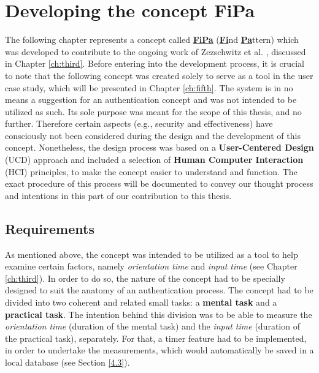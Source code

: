 
\chapter{Developing the concept FiPa}\label{ch:forth}
The following chapter represents a concept called \underline{\textbf{FiPa}} (\underline{\textbf{Fi}}nd \underline{\textbf{Pa}}ttern) which was developed to contribute to the ongoing work of Zezschwitz et al. \cite{Zezschwitz}, discussed in Chapter \ref{ch:third}. Before entering into the development process, it is crucial to note that the following concept was created solely to serve as a tool in the user case study, which will be presented in Chapter \ref{ch:fifth}. The system is in no means a suggestion for an authentication concept and was not intended to be utilized as such. Its sole purpose was meant for the scope of this thesis, and no further. Therefore certain aspects (e.g., security and effectiveness) have consciously not been considered during the design and the development of this concept. Nonetheless, the design process was based on a  \textbf{User-Centered Design} (UCD) approach and included a selection of \textbf{Human Computer Interaction} (HCI) principles, to make the concept easier to understand and function. The exact procedure of this process will be documented to convey our thought process and intentions in this part of our contribution to this thesis. 

\section{Requirements} \label{4.1}
As mentioned above, the concept was intended to be utilized as a tool to help examine certain factors, namely \textit{orientation time} and \textit{input time} (see Chapter \ref{ch:third}). In order to do so, the nature of the concept had to be specially designed to suit the anatomy of an authentication process. The concept had to be divided into two coherent and related small tasks: a \textbf{mental task} and a \textbf{practical task}. The intention behind this division was to be able to measure the \textit{orientation time} (duration of the mental task) and the \textit{input time} (duration of the practical task), separately. For that, a timer feature had to be implemented, in order to undertake the measurements, which would automatically be saved in a local database (see Section \ref{4.3}).\\


